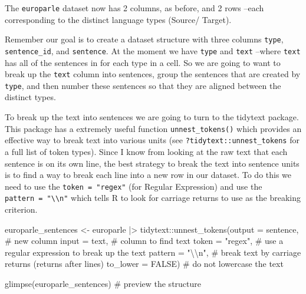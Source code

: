 \documentclass[
  letterpaper,
]{latex/krantz}
\newenvironment{Shaded}{\begin{snugshade}}{\end{snugshade}}
\newcommand{\AttributeTok}[1]{\textcolor[rgb]{0.40,0.45,0.13}{#1}}
\newcommand{\CommentTok}[1]{\textcolor[rgb]{0.37,0.37,0.37}{#1}}
\newcommand{\ConstantTok}[1]{\textcolor[rgb]{0.56,0.35,0.01}{#1}}
\newcommand{\FunctionTok}[1]{\textcolor[rgb]{0.28,0.35,0.67}{#1}}
\newcommand{\NormalTok}[1]{\textcolor[rgb]{0.00,0.23,0.31}{#1}}
\newcommand{\OtherTok}[1]{\textcolor[rgb]{0.00,0.23,0.31}{#1}}
\newcommand{\SpecialCharTok}[1]{\textcolor[rgb]{0.37,0.37,0.37}{#1}}
\newcommand{\StringTok}[1]{\textcolor[rgb]{0.13,0.47,0.30}{#1}}
\begin{document}
The \texttt{europarle} dataset now has 2 columns, as before, and 2 rows
--each corresponding to the distinct language types (Source/ Target).

Remember our goal is to create a dataset structure with three columns
\texttt{type}, \texttt{sentence\_id}, and \texttt{sentence}. At the
moment we have \texttt{type} and \texttt{text} --where \texttt{text} has
all of the sentences in for each type in a cell. So we are going to want
to break up the \texttt{text} column into sentences, group the sentences
that are created by \texttt{type}, and then number these sentences so
that they are aligned between the distinct types.

To break up the text into sentences we are going to turn to the tidytext
package. This package has a extremely useful function
\texttt{unnest\_tokens()} which provides an effective way to break text
into various units (see \texttt{?tidytext::unnest\_tokens} for a full
list of token types). Since I know from looking at the raw text that
each sentence is on its own line, the best strategy to break the text
into sentence units is to find a way to break each line into a new row
in our dataset. To do this we need to use the \texttt{token\ =\ "regex"}
(for Regular Expression) and use the
\texttt{pattern\ =\ "\textbackslash{}\textbackslash{}n"} which tells R
to look for carriage returns to use as the breaking criterion.

\begin{Shaded}
\begin{Highlighting}[]
\NormalTok{europarle\_sentences }\OtherTok{\textless{}{-}} 
\NormalTok{  europarle }\SpecialCharTok{|\textgreater{}} 
\NormalTok{  tidytext}\SpecialCharTok{::}\FunctionTok{unnest\_tokens}\NormalTok{(}\AttributeTok{output =}\NormalTok{ sentence, }\CommentTok{\# new column}
                          \AttributeTok{input =}\NormalTok{ text, }\CommentTok{\# column to find text}
                          \AttributeTok{token =} \StringTok{"regex"}\NormalTok{, }\CommentTok{\# use a regular expression to break up the text}
                          \AttributeTok{pattern =} \StringTok{"}\SpecialCharTok{\textbackslash{}\textbackslash{}}\StringTok{n"}\NormalTok{, }\CommentTok{\# break text by carriage returns (returns after lines)}
                          \AttributeTok{to\_lower =} \ConstantTok{FALSE}\NormalTok{) }\CommentTok{\# do not lowercase the text}

\FunctionTok{glimpse}\NormalTok{(europarle\_sentences) }\CommentTok{\# preview the structure}
\end{Highlighting}
\end{Shaded}
\end{document}
